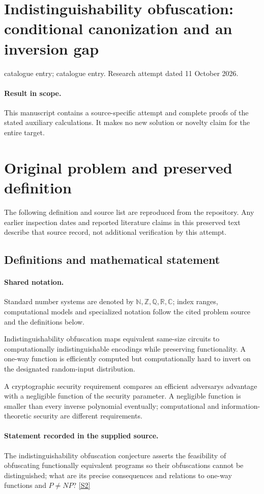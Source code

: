 \documentclass[11pt]{article}
\begin{document}
\section*{Indistinguishability obfuscation: conditional canonization and an inversion gap}
\noindent catalogue entry; catalogue entry. Research attempt dated 11 October 2026.
\paragraph{Result in scope.}This manuscript contains a source-specific attempt and complete proofs of the stated auxiliary calculations. It makes no new solution or novelty claim for the entire target.
\section{Original problem and preserved definition}
The following definition and source list are reproduced from the repository. Any earlier inspection dates and reported literature claims in this preserved text describe that source record, not additional verification by this attempt.
\subsection{Definitions and mathematical statement}

\paragraph{Shared notation.}Standard number systems are denoted by $\mathbb N,\mathbb Z,\mathbb Q,\mathbb R,\mathbb C$; index ranges, computational models and specialized notation follow the cited problem source and the definitions below.


Indistinguishability obfuscation maps equivalent same-size circuits to computationally indistinguishable encodings while preserving functionality. A one-way function is efficiently computed but computationally hard to invert on the designated random-input distribution.

A cryptographic security requirement compares an efficient adversary\textquotesingle s advantage with a negligible function of the security parameter. A negligible function is smaller than every inverse polynomial eventually; computational and information-theoretic security are different requirements.
\paragraph{Statement recorded in the supplied source.}
The indistinguishability obfuscation conjecture asserts the feasibility of obfuscating functionally equivalent programs so their obfuscations cannot be distinguished; what are its precise consequences and relations to one-way functions and $P\neq NP$? \href{https://doi.org/10.4171/owr/2015/54}{[S2]}
\end{document}
